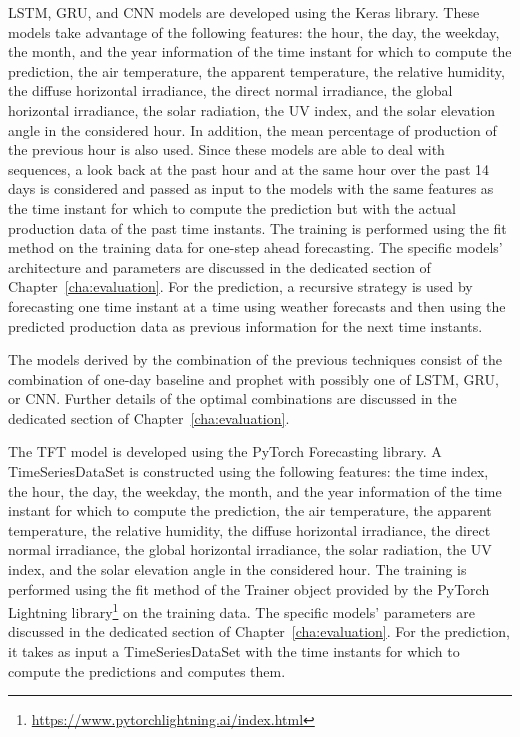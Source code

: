 LSTM, GRU, and CNN models are developed using the Keras library.
These models take advantage of the following features: the hour, the day, the weekday, the month, and the year information of the time instant for which to compute the prediction, the air temperature, the apparent temperature, the relative humidity, the diffuse horizontal irradiance, the direct normal irradiance, the global horizontal irradiance, the solar radiation, the UV index, and the solar elevation angle in the considered hour.
In addition, the mean percentage of production of the previous hour is also used.
Since these models are able to deal with sequences, a look back at the past hour and at the same hour over the past 14 days is considered and passed as input to the models with the same features as the time instant for which to compute the prediction but with the actual production data of the past time instants.
The training is performed using the fit method on the training data for one-step ahead forecasting.
The specific models' architecture and parameters are discussed in the dedicated section of Chapter~\ref{cha:evaluation}.
For the prediction, a recursive strategy is used by forecasting one time instant at a time using weather forecasts and then using the predicted production data as previous information for the next time instants.

The models derived by the combination of the previous techniques consist of the combination of one-day baseline and prophet with possibly one of LSTM, GRU, or CNN.
Further details of the optimal combinations are discussed in the dedicated section of Chapter~\ref{cha:evaluation}.

The TFT model is developed using the PyTorch Forecasting library.
A TimeSeriesDataSet is constructed using the following features: the time index, the hour, the day, the weekday, the month, and the year information of the time instant for which to compute the prediction, the air temperature, the apparent temperature, the relative humidity, the diffuse horizontal irradiance, the direct normal irradiance, the global horizontal irradiance, the solar radiation, the UV index, and the solar elevation angle in the considered hour.
The training is performed using the fit method of the Trainer object provided by the PyTorch Lightning library\footnote{ \url{https://www.pytorchlightning.ai/index.html} } on the training data.
The specific models' parameters are discussed in the dedicated section of Chapter~\ref{cha:evaluation}.
For the prediction, it takes as input a TimeSeriesDataSet with the time instants for which to compute the predictions and computes them.

